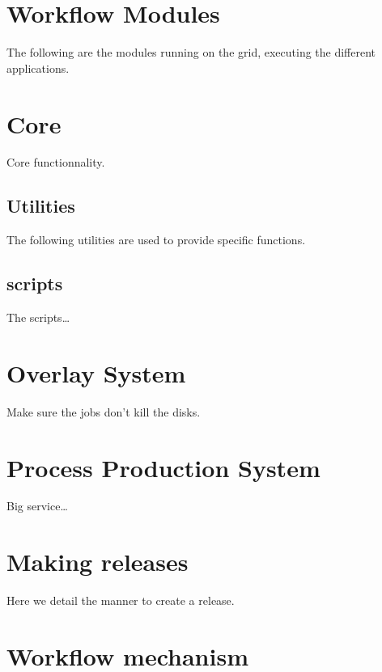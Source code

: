 \documentclass[a4paper,12pt]{article}
\begin{document}
\section{Workflow Modules}\label{modules}
The following are the modules running on the grid, executing the different
applications.

\section{Core}\label{core}
Core functionnality.
\subsection{Utilities}\label{coreutilities}
The following utilities are used to provide specific functions.
\subsection{scripts}\label{corescripts}
The scripts\ldots

\section{Overlay System}\label{overlaysys}
Make sure the jobs don't kill the disks.

\section{Process Production System}\label{processprodsys}
Big service\ldots

\section{Making releases}\label{makingrelease}
Here we detail the manner to create a release.

\section{Workflow mechanism}\label{workflowsys}
\end{document}
